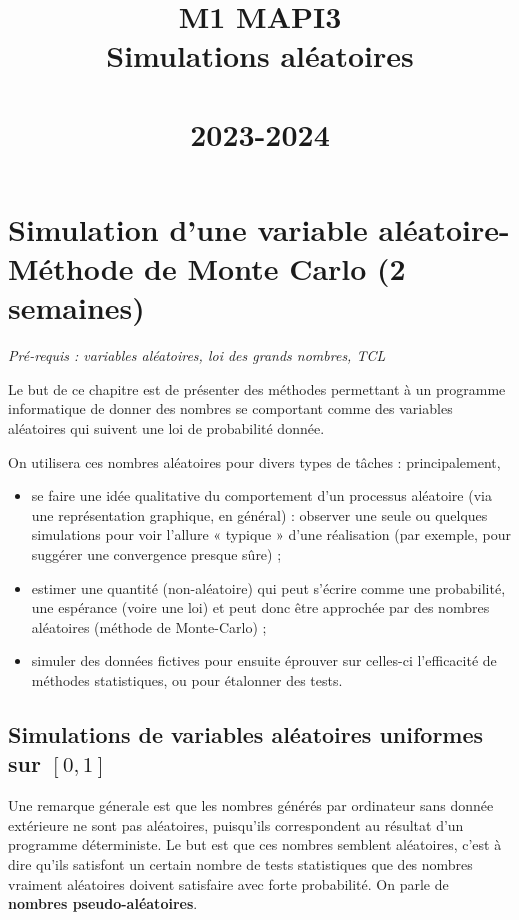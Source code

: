 \documentclass[a4paper,12pt]{book}
\date{}
\title{{\bf \huge M1 MAPI3 \\ Simulations aléatoires}\\~
\\{2023-2024\\
}}
\author{}
\begin{document}
\maketitle
\noindent

\chapter[Simulation de v.a. et méthode de MC (2 semaines)]{Simulation d'une variable al\'eatoire- Méthode de Monte Carlo (2 semaines)}

\textit{Pré-requis : variables aléatoires, loi des grands nombres, TCL}

   Le but de ce chapitre est de pr\'esenter des m\'ethodes permettant à un programme informatique de donner des nombres
se comportant comme des variables al\'eatoires qui suivent une loi de probabilit\'e donn\'ee.

On utilisera ces nombres aléatoires pour divers types de tâches : principalement,
\begin{itemize}
\item se faire une idée qualitative du comportement d’un processus aléatoire (via une représentation graphique, en général) :
observer une seule ou quelques simulations pour voir l’allure « typique » d’une réalisation (par exemple, pour suggérer
une convergence presque sûre) ;
\item estimer une quantité (non-aléatoire) qui peut s'écrire comme une probabilité, une espérance (voire une loi)  et peut donc être approchée par des nombres aléatoires (méthode de Monte-Carlo) ;
\item simuler des données fictives pour ensuite éprouver sur celles-ci l’efficacité de méthodes statistiques, ou pour
étalonner des tests.
\end{itemize}

\section{Simulations de variables aléatoires uniformes sur $[0,1]$}


  Une remarque g\'enerale est que les
  nombres g\'en\'er\'es par ordinateur sans donn\'ee ext\'erieure ne sont pas al\'eatoires, puisqu'ils correspondent au r\'esultat d'un programme
  d\'eterministe. Le but est que ces nombres semblent al\'eatoires, c'est \`a dire qu'ils satisfont
  un certain nombre de tests statistiques que des nombres vraiment al\'eatoires doivent satisfaire avec forte probabilit\'e.
On parle de \textbf{nombres pseudo-al\'eatoires}.
\end{document}
